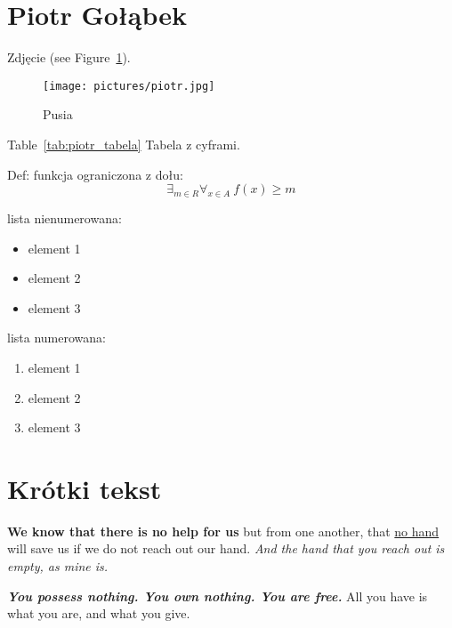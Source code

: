 \section{Piotr Gołąbek}
\label{sec:piotr}

Zdjęcie (see Figure~\ref{fig:cat}).

\begin{figure}[htbp]
    \centering
    \texttt{[image: pictures/piotr.jpg]} 
    \caption{Pusia}
    \label{fig:cat}
\end{figure}

Table~\ref{tab:piotr_tabela} Tabela z cyframi.



Def: funkcja ograniczona z dołu: \[\exists_{m\in R} \forall_{x\in A}\ f(x)\geq{m}\]

lista nienumerowana:
\begin{itemize}
\item element 1
\item element 2
\item element 3
\end{itemize}

lista numerowana:
\begin{enumerate}
\item element 1
\item element 2
\item element 3
\end{enumerate}

\section*{Krótki tekst}

\textbf{We know that there is no help for us} but from one another, that \underline{no hand} will save us if we do not reach out our hand. \textit{And the hand that you reach out is empty, as mine is.}\par
\textbf{\textit{You possess nothing. You own nothing. You are free.}} All you have is what you are, and what you give. 